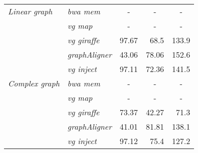 \begin{table}[h]
{\begin{tabular}{ll|rrr}
			\textit{Linear graph} & \textit{bwa mem} & \multicolumn{1}{c}{-} & \multicolumn{1}{c}{-} & \multicolumn{1}{c}{-} \\
			& \textit{vg map} & \multicolumn{1}{c}{-} & \multicolumn{1}{c}{-} & \multicolumn{1}{c}{-} \\
			& \textit{vg giraffe} & 97.67 & 68.5 & 133.9 \\
			& \textit{graphAligner} & 43.06 & 78.06 & 152.6 \\
			& \textit{vg inject} & 97.11 & 72.36 & 141.5 \\ \hline
			\textit{Complex graph} & \textit{bwa mem} & \multicolumn{1}{c}{-} & \multicolumn{1}{c}{-} & \multicolumn{1}{c}{-} \\
			& \textit{vg map} & \multicolumn{1}{c}{-} & \multicolumn{1}{c}{-} & \multicolumn{1}{c}{-} \\
			& \textit{vg giraffe} & 73.37 & 42.27 & 71.3 \\
			& \textit{graphAligner} & 41.01 & 81.81 & 138.1 \\
			& \textit{vg inject} & 97.12 & 75.4 & 127.2                                                             
		\end{tabular}
	}
	\label{tab:graphMappingStats}
\end{table}

